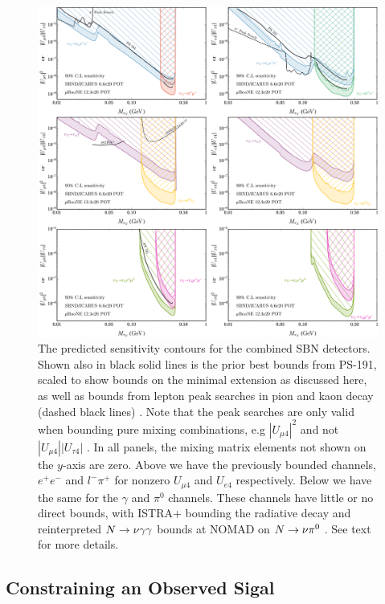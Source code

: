 \documentclass[11pt, a4paper]{article}
\def\ster{\ensuremath N}
\begin{document}
\begin{figure}[t]
\center
\includegraphics[width=1.0\textwidth]{figures/band_sbn_new.pdf}

\caption{\label{fig:band_sbn}The predicted sensitivity contours for the
combined SBN detectors. Shown also in black solid lines is the prior best bounds
from PS-191, scaled to show bounds on the minimal extension as discussed here,
as well as bounds from lepton peak searches in pion and kaon decay
\cite{PhysRevD.46.R885,PhysRevLett.68.3000}(dashed black lines) . Note that the
peak searches are only valid when bounding pure mixing combinations, e.g
$|U_{\mu 4}|^2$ and not $|U_{\mu 4}||U_{\tau 4}|$ . In all panels, the mixing
matrix elements not shown on the $y$-axis are zero. Above we have the
previously bounded channels, $e^+e^-$ and $l^- \pi^+$ for nonzero $U_{\mu 4}$
and $U_{e4}$ respectively. Below we have the same for the $\gamma$ and $\pi^0$
channels. These channels have little or no direct bounds, with ISTRA+ bounding
the radiative decay\cite{Duk:2011yv} and reinterpreted $\ster \rightarrow \nu
\gamma \gamma$ bounds at NOMAD on $\ster \rightarrow \nu \pi^0$
\cite{Gninenko:1998nn}. See text for more details. }

\end{figure}

\subsection{\label{sec:timing_physics}Constraining an Observed Sigal}
\end{document}
